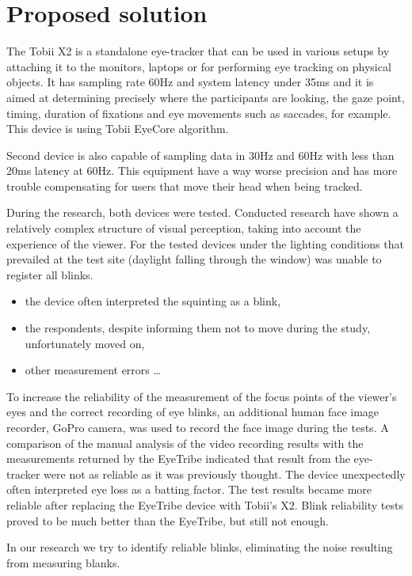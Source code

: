 \documentclass[runningheads,a4paper]{llncs}
\begin{document}
\section{Proposed solution} 
The Tobii X2 is a standalone eye-tracker that can be used in various setups by attaching it to the monitors, laptops or for performing eye tracking on physical objects. It has sampling rate 60Hz and system latency under 35ms and it is aimed at determining precisely where the participants are looking, the gaze point, timing, duration of fixations and eye movements such as saccades, for example. This device is using Tobii EyeCore\textsuperscript{\tiny\textregistered} algorithm. 
\par Second device is also capable of sampling data in 30Hz and 60Hz with less than 20ms latency at 60Hz. This equipment have a way worse precision and has more trouble compensating for users that move their head when being tracked. 
\newline\par
During the research, both devices were tested.
Conducted research have shown a relatively complex structure of visual perception, taking into account the experience of the viewer.
For the tested devices under the lighting conditions that prevailed at the test site (daylight falling through the window) was unable to register all blinks.
\begin{itemize}
  \item the device often interpreted the squinting as a blink,
  \item the respondents, despite informing them not to move during the study, unfortunately moved on,
  \item other measurement errors \ldots
\end{itemize}
To increase the reliability of the measurement of the focus points of the viewer's eyes and the correct recording of eye blinks, an additional human face image recorder, GoPro camera, was used to record the face image during the tests.
A comparison of the manual analysis of the video recording results with the measurements returned by the EyeTribe indicated that  result from the eye-tracker were not as reliable as it was previously thought. The device unexpectedly often interpreted eye loss as a batting factor. The test results became more reliable after replacing the EyeTribe device with Tobii's X2. Blink reliability tests proved to be much better than the EyeTribe, but still not enough.

In our research we try to identify reliable blinks, eliminating the noise resulting from measuring blanks.






\end{document}
